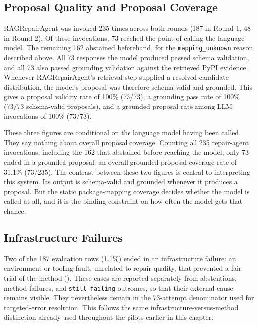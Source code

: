 \subsection{Proposal Quality and Proposal Coverage}
\label{sec:v-final-proposal}

RAGRepairAgent was invoked 235 times across both rounds (187 in Round 1,
48 in Round 2). Of those invocations, 73 reached the point of calling the
language model. The remaining 162 abstained beforehand, for the
\texttt{mapping\_unknown} reason described above. All 73 responses the
model produced passed schema validation, and all 73 also passed grounding
validation against the retrieved PyPI evidence. Whenever RAGRepairAgent's
retrieval step supplied a resolved candidate distribution, the model's
proposal was therefore schema-valid and grounded. This gives a proposal
validity rate of 100\% (73/73), a grounding pass rate of 100\% (73/73
schema-valid proposals), and a grounded proposal rate among LLM
invocations of 100\% (73/73).

These three figures are conditional on the language model having been
called. They say nothing about overall proposal coverage. Counting all
235 repair-agent invocations, including the 162 that abstained before
reaching the model, only 73 ended in a grounded proposal: an overall
grounded proposal coverage rate of 31.1\% (73/235). The contrast between
these two figures is central to interpreting this system. Its output is 
schema-valid and grounded whenever it produces a proposal. But the static package-mapping
coverage decides whether the model is called at all, and it is the
binding constraint on how often the model gets that chance.

\subsection{Infrastructure Failures}
\label{sec:v-final-infra}

Two of the 187 evaluation rows (1.1\%) ended in an infrastructure
failure: an environment or tooling fault, unrelated to repair quality,
that prevented a fair trial of the method ().
These cases are reported separately from abstentions, method failures, and
\texttt{still\_failing} outcomes, so that their external cause remains visible. 
They nevertheless remain in the 73-attempt denominator used for targeted-error resolution.
This follows the same infrastructure-versus-method
distinction already used throughout the pilots earlier in this chapter.


